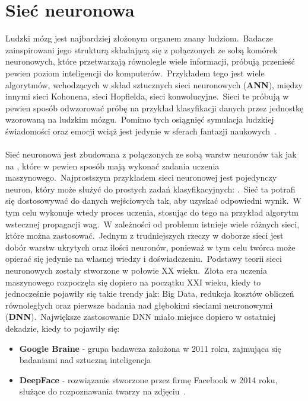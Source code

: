 \section{Sieć neuronowa}
\label{sec:snn}
Ludzki mózg jest najbardziej złożonym organem znany ludziom.\ Badacze zainspirowani jego strukturą składającą się z połączonych ze sobą komórek neuronowych, które przetwarzają równolegle wiele informacji, próbują przenieść pewien poziom inteligencji do komputerów.\ Przykładem tego jest wiele algorytmów, wchodzących w skład sztucznych sieci neuronowych  (\textbf{ANN}), między innymi sieci Kohonena, sieci Hopfielda, sieci konwolucyjne.\ Sieci te próbują w pewien sposób odwzorować próbę na przykład klasyfikacji danych przez jednostkę wzorowaną na ludzkim mózgu.\ Pomimo tych osiągnięć symulacja ludzkiej świadomości oraz emocji wciąż jest jedynie w sferach fantazji naukowych~\cite{Wang2003}.
\\ \\
Sieć neuronowa jest zbudowana z połączonych ze sobą warstw neuronów tak jak na , które w pewien sposób mają wykonać zadania uczenia maszynowego.\ Najprostszym przykładem sieci neuronowej jest pojedynczy neuron, który może służyć do prostych zadań klasyfikacyjnych: .\ Sieć ta potrafi się dostosowywać do danych wejściowych tak, aby uzyskać odpowiedni wynik.\ W tym celu wykonuje wtedy proces uczenia, stosując do tego na przykład algorytm wstecznej propagacji wag.\ W zależności od problemu istnieje wiele różnych sieci, które można zastosować.\ Jednym z trudniejszych rzeczy w doborze sieci jest dobór warstw ukrytych oraz ilości neuronów, ponieważ w tym celu twórca może opierać się jedynie na własnej wiedzy i doświadczeniu.\ Podstawy teorii sieci neuronowych zostały stworzone w połowie XX wieku.\ Złota era uczenia maszynowego rozpoczęła się dopiero na początku XXI wieku, kiedy to jednocześnie pojawiły się takie trendy jak: Big Data, redukcja kosztów obliczeń równoległych oraz pierwsze badania nad głębokimi sieciami neuronowymi  (\textbf{DNN}).\ Największe zastosowanie DNN miało miejsce dopiero w ostatniej dekadzie, kiedy to pojawiły się:

\begin{itemize}
    \item \textbf{Google Braine} - grupa badawcza założona w 2011 roku, zajmująca się badaniami nad sztuczną inteligencja
    \item \textbf{DeepFace} - rozwiązanie stworzone przez firmę Facebook w 2014 roku, służące do rozpoznawania twarzy na zdjęciu~\cite{Koch2022, Fradkov2020}.
\end{itemize}

